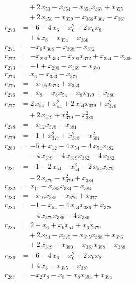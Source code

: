 \begin{align*}
&\quad{}+ 2\,x_{53} - x_{354} - x_{354} x_{367} + x_{355} \\
&\quad{}+ 2\,x_{358} - x_{359} - x_{366} x_{367} - x_{367} \\
r_{270} &= -6 - 4\,x_{6} - x_{6}^{2} + 2\,x_{6} x_{8} \\
&\quad{}+ 4\,x_{8} - x_{354} - x_{366} \\
r_{271} &= -x_{6} x_{368} - x_{368} + x_{372} \\
r_{272} &= -x_{290} x_{353} - x_{290} x_{372} + x_{354} - x_{369} \\
r_{273} &= -1 + x_{290} - x_{369} - x_{370} \\
r_{274} &= x_{6} - x_{353} - x_{371} \\
r_{275} &= -x_{195} x_{373} + x_{353} \\
r_{276} &= -x_{8} - x_{8} x_{54} - x_{8} x_{379} + x_{380} \\
r_{277} &= 2\,x_{54} + x_{54}^{2} + 2\,x_{54} x_{379} + x_{376}^{2} \\
&\quad{}+ 2\,x_{379} + x_{379}^{2} - x_{380}^{2} \\
r_{278} &= -x_{12} x_{378} + x_{381} \\
r_{279} &= -1 + x_{377}^{2} + x_{378}^{2} - x_{381}^{2} \\
r_{280} &= -5 + x_{12} - 4\,x_{54} - 4\,x_{54} x_{382} \\
&\quad{}- 4\,x_{379} - 4\,x_{379} x_{382} - 4\,x_{382} \\
r_{281} &= -1 - 2\,x_{54} - x_{54}^{2} - 2\,x_{54} x_{379} \\
&\quad{}- 2\,x_{379} - x_{379}^{2} + x_{384} \\
r_{282} &= x_{11} - x_{383} x_{384} - x_{384} \\
r_{283} &= -x_{10} x_{385} - x_{376} + x_{377} \\
r_{284} &= -1 - x_{54} - 4\,x_{54} x_{386} + x_{378} \\
&\quad{}- 4\,x_{379} x_{386} - 4\,x_{386} \\
r_{285} &= 2 + x_{6} + x_{6} x_{54} + x_{6} x_{379} \\
&\quad{}+ 2\,x_{54} - x_{375} - x_{375} x_{388} + x_{376} \\
&\quad{}+ 2\,x_{379} - x_{380} - x_{387} x_{388} - x_{388} \\
r_{286} &= -6 - 4\,x_{6} - x_{6}^{2} + 2\,x_{6} x_{8} \\
&\quad{}+ 4\,x_{8} - x_{375} - x_{387} \\
r_{287} &= -x_{2} x_{8} - x_{8} - x_{8} x_{393} + x_{394} \\

\end{align*}
